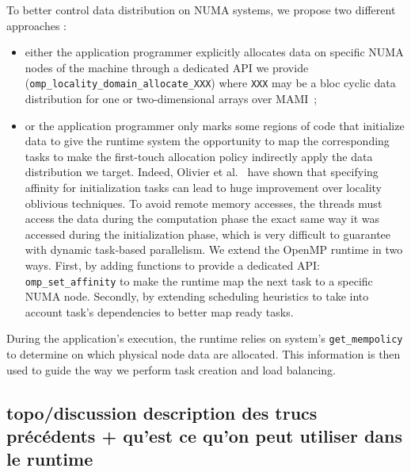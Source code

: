 To better control data distribution on NUMA systems, we propose two different approaches :
\begin{itemize}
\item either the application programmer explicitly allocates data on specific NUMA nodes of the machine through a dedicated API we provide~\cite{Durand2013} (\verb!omp_locality_domain_allocate_XXX!) where \verb/XXX/ may be a bloc cyclic data distribution for one or two-dimensional arrays over MAMI~\cite{BroFurGogWacNam10IJPP};
\item or the application programmer only marks some regions of code that initialize data to give the runtime system the opportunity to map the corresponding tasks to make the first-touch allocation policy indirectly apply the data distribution we target. Indeed, Olivier et al.~\cite{Olivier:2012:CMW:2388996.2389085}
have shown that specifying affinity for initialization tasks can lead to huge improvement over locality oblivious techniques.
To avoid remote memory accesses, the threads must access the data during the computation phase the exact same way it was accessed during the initialization phase, which is very difficult to guarantee with dynamic task-based parallelism.
We extend the OpenMP runtime in two ways. First, by adding functions to provide a dedicated API: \verb!omp_set_affinity! to  make the runtime map the next task to a specific NUMA node. Secondly, by extending scheduling heuristics to take into account task's dependencies to better map ready tasks.
\end{itemize}
During the application's execution, the runtime relies on system's \verb/get_mempolicy/ to determine on which physical node data are allocated.
This information is then used to guide the way we perform task creation and load balancing.



\subsection{topo/discussion description des trucs précédents + qu'est ce qu'on peut utiliser dans le runtime}

